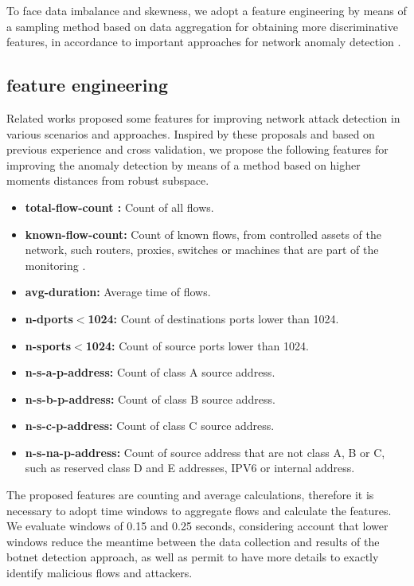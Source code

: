 \documentclass[review]{elsarticle}
\begin{document}
To face data imbalance and skewness, we adopt a feature engineering by means of a sampling method based on data aggregation for obtaining more discriminative features, in accordance to important approaches for network anomaly detection \cite{lakhina2005mining, callegari2011novel, garcia2014empirical, chandrashekar2014survey,acarali2016survey, vieira2017model}.

\subsection{feature engineering}
\label{sec:feat_eng}

Related works proposed some features for improving network attack detection in various scenarios and approaches\cite{lakhina2005mining,gu2008botminer,callegari2011novel,chandrashekar2014survey,garcia2014empirical,acarali2016survey}. Inspired by these proposals and based on previous experience \cite{vieira2017model, galibus2017offline} and cross validation, we propose the following features for improving the anomaly detection by means of a method based on higher moments distances from robust subspace.
	
\begin{itemize}
	\item \textbf{total-flow-count :} Count of all flows.
	\item \textbf{known-flow-count:} Count of known flows, from controlled assets of the network, such routers, proxies, switches or machines that are part of the monitoring \cite{garcia2014identifying}.
	\item \textbf{avg-duration:} Average time of flows.
	\item \textbf{n-dports$<$1024:} Count of destinations ports lower than 1024.
	\item \textbf{n-sports$<$1024:} Count of source ports lower than 1024.
	\item \textbf{n-s-a-p-address:} Count of class A source address.
	\item \textbf{n-s-b-p-address:} Count of class B source address.
	\item \textbf{n-s-c-p-address:} Count of class C source address.
	\item \textbf{n-s-na-p-address:} Count of source address that are not class A, B or C, such as reserved class D and E addresses, IPV6 or internal address.
\end{itemize}

The proposed features are counting and average calculations, therefore it is necessary to adopt time windows to aggregate flows and calculate the features. We evaluate windows of 0.15 and 0.25 seconds, considering account that lower windows reduce the meantime between the data collection and results of the botnet detection approach, as well as permit to have more details to exactly identify malicious flows and attackers.
\end{document}
